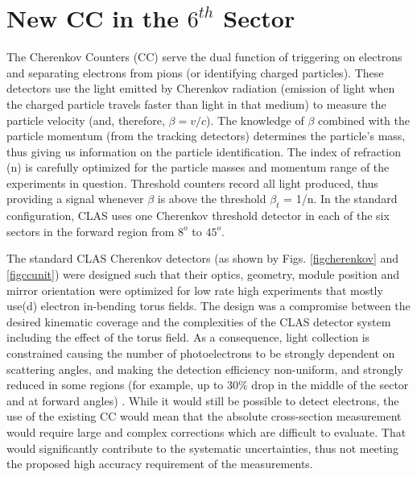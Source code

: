 \section{New CC in the $6^{th}$ Sector}
\label{newCCsec}
The Cherenkov Counters (CC) serve the dual function of triggering on electrons and separating electrons from pions (or identifying charged particles). These detectors use the light emitted by Cherenkov radiation (emission of light when the charged particle travels faster than light in that medium) to measure the particle velocity (and, therefore, $\beta=v/c$). The knowledge of $\beta$ combined with the particle momentum (from the tracking detectors) determines the particle's mass, thus giving us information on %
the particle identification. %
The index of refraction (n) is carefully optimized for the particle masses and momentum range of the experiments in question. Threshold counters record all light produced, thus providing a signal whenever $\beta$ is above the threshold $\beta_t$ = 1/n. In the standard configuration, CLAS uses one Cherenkov threshold detector in each of the six sectors in the forward region from $8^o$ to $45^o$.




The standard CLAS Cherenkov detectors (as shown by Figs. \ref{figcherenkov} and \ref{figccunit}) were designed such that their optics, geometry, module position and mirror orientation were optimized for low rate high \qsq experiments that mostly use(d) electron in-bending torus fields. The design was a compromise between the desired kinematic coverage and the complexities of the CLAS detector system including the effect of the torus field. As a consequence, light collection is constrained causing the number of photoelectrons to be strongly dependent on scattering angles, and making the detection efficiency non-uniform, and strongly reduced in some regions (for example, up to 30\% drop in the middle of the sector and at forward angles) \cite{propE03_006}. While it would still be possible to detect electrons, the use of the existing CC would mean that the absolute cross-section measurement would require large and complex corrections which are difficult to evaluate. %
That would significantly contribute to the systematic uncertainties, thus not meeting the proposed high accuracy requirement of the measurements.

